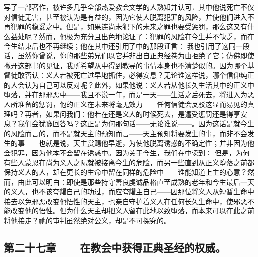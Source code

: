 写了一部著作，被许多几乎全部热爱教会文学的人熟知并认可，其中他说死亡不仅对信徒无害，甚至被认为是有益的，因为它使人脱离犯罪的风险，并使他们进入不再犯罪的稳妥之中。但是，如果连尚未犯下的未来之罪也要受惩罚，那么这又有什么益处呢？然而，他极为充分且出色地论证了：犯罪的风险在今生并不缺乏，而在今生结束后也不再继续；他在其中还引用了中的那段证言： 我也引用了这同一段话，虽然你曾说，你的那些弟兄们以它并非出自正典经卷为由拒绝了它；仿佛即使撇开这部书的见证，我所希望从中得到教导的事情本身也不清楚似的。因为哪个基督徒敢否认：义人若被死亡过早地抓住，必得安息？无论谁这样说，哪个信仰纯正的人会认为自己可以反对呢？此外，如果他说：义人若从他长久生活其中的正义中堕落，并在那邪恶中——我且不说一年，而是一天——生活之后死去，将进入为恶人所准备的惩罚，他的正义在未来将毫无效力——任何信徒会反驳这显而易见的真理吗？再者，如果问我们：他若在还是义人的时候死去，是遭受惩罚还是得享安息？我们会犹豫回答吗？这正是为何那句话——无论谁说——。因为这话是就今生的风险而言的，而不是就天主的预知而言——天主预知将要发生的事，而非不会发生的事——也就是说，天主赏赐他早逝，为使他脱离诱惑的不确定性；并非因为他会犯罪，因为他本不会留在诱惑中。因为关于今生，我们在中读到： 但是，为何有些人蒙恩在尚为义人之际就被接离今生的危险，而另一些直到从正义堕落之前都保持义人的人，却在更长的生命中留在同样的危险中——谁能知道上主的心意？然而，由此可以明白：即使是那些持守善良虔诚品格直至成熟的老年和今生最后一天的义人，也不该夸耀自己的功过，而应夸耀主自己——因那位将义人从短暂生命中接去以免邪恶改变他悟性的天主，也亲自守护着义人在任何长久生命中，使邪恶不能改变他的悟性。但为什么天主却把义人留在此地以致堕落，而本来可以在此之前将他接走？祂的审判虽然绝对公义，却是不可探究的。\par


\subsection{第二十七章——在教会中获得正典圣经的权威。}

